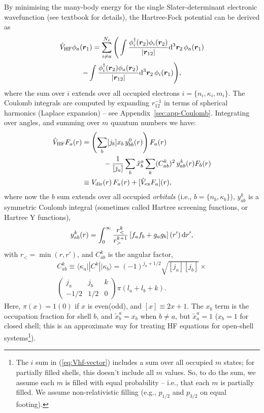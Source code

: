 \documentclass[10pt,twocolumn,a4paper]{article}%
\newcommand{\bra}[1]{\ensuremath{\langle #1|}}	%
\newcommand{\ket}[1]{\ensuremath{|#1\rangle}}	%
\newcommand{\threej}[6]{\ensuremath{\begin{pmatrix}#1&#2&#3\\#4&#5&#6\end{pmatrix}}}	%
\renewcommand{\v}[1]{\ensuremath{\boldsymbol{#1}}}		%
\newcommand{\be}{\begin{equation}}
\newcommand{\ee}{\end{equation}}
\def\d{\ensuremath{{\rm d}}}
\renewcommand{\k}{\ensuremath{\kappa}}
\begin{document}
By minimising the many-body energy for the single Slater-determinant electronic wavefunction (see textbook \cite{JohnsonBook2007} for details), the Hartree-Fock potential can be derived as
\begin{multline}\label{eq:Vhf-vector}
\hat V_{\rm HF}\phi_a(\v{r}_1) = \sum_{i\neq a}^{N_c}\Bigg(
\int \frac{\phi_i^\dag(\v{r}_2)\phi_i(\v{r}_2)}{|\v{r}_{12}|}\d^3\v{r}_2\,\phi_a(\v{r}_1)\\
-\int \frac{\phi_i^\dag(\v{r}_2)\phi_a(\v{r}_2)}{|\v{r}_{12}|}\d^3\v{r}_2\,\phi_i(\v{r}_1)
\Bigg),
\end{multline}
where the sum over $i$ extends over all occupied electrons $i=\{n_i,\k_i,m_i\}$.
The Coulomb integrals are computed by expanding ${r}_{12}^{-1}$ in terms of spherical harmonics (Laplace expansion) -- see Appendix~\ref{sec:app-Coulomb}.
Integrating over angles, and summing over $m$ quantum numbers we have:
\begin{align}
\label{eq:Vhf-radial}
\hat V_{\rm HF}F_a(r)& = \left(\sum_b [j_b] x_b  \,  y^0_{bb}(r)\right)F_a(r)
\notag \\  & \qquad\quad
-\frac{1}{[j_a]}\sum_b \tilde x_b^{a}\sum_k (C^k_{ab})^2\, y^k_{ab}(r) F_b(r)  \\
\label{eq:Vhf}
&\equiv V_{\rm dir}(r)\,F_a(r) + [\hat V_{\rm ex}F_a](r),
\end{align}
where now the $b$ sum extends over all occupied {\em orbitals} (i.e., $b=\{n_b,\k_b\}$),
$y_{ab}^k$ is a symmetric Coulomb integral (sometimes called Hartree screening functions, or Hartree Y functions),
%
\be\label{eq:ykab}
y^k_{ab}(r) = \int_0^\infty \frac{r_<^k}{r_>^{k+1}}\left[f_a f_b + g_a g_b\right](r')\, \d r',
\ee
with $r_{<} = \min(r,r')$, and
$C^k_{ab}$ is the angular factor,
%
\begin{multline}\label{eq:Ckab}
C^k_{ab}\equiv\bra{\k_a}|C^k|\ket{\k_b} = (-1)^{j_a+1/2}\sqrt{[j_a][j_b]}\times\\\threej{j_a}{j_b}{k}{-1/2}{1/2}{0}\pi(l_a+l_b+k).
\end{multline}
Here, $\pi(x)=1(0)$ if $x$ is even(odd), and $[x]\equiv2x+1$.
The $x_b$ term is the occupation fraction for shell $b$, and
$\tilde x^a_b = x_b$ when $b\neq a$, but $\tilde x^a_a = 1$
($x_b=1$ for closed shell; this is an approximate way for treating HF equations for open-shell systems\footnote{The $i$ sum in (\ref{eq:Vhf-vector}) includes a sum over all occupied $m$ states; for partially filled shells, this doesn't include all $m$ values. So, to do the sum, we assume each $m$ is filled with equal probability -- i.e., that each $m$ is partially filled. We assume non-relativistic filling (e.g., $p_{1/2}$ and $p_{3/2}$ on equal footing).}).
\end{document}

